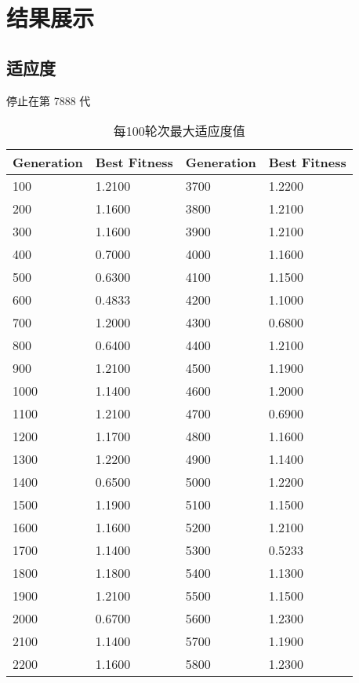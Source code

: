 \documentclass{ctexart}
\begin{document}
	\vspace{100pt}
	\section{结果展示}
	\subsection{适应度}
	停止在第 7888 代
		\begin{table}[htbp]
		\centering
		\caption{每100轮次最大适应度值}
		\begin{tabular}{|l|l||l|l|}
		\hline
		\textbf{Generation} & \textbf{Best Fitness} & \textbf{Generation} & \textbf{Best Fitness} \\
		\hline
		100 & 1.2100 & 3700 & 1.2200 \\
		\hline
		200 & 1.1600 & 3800 & 1.2100 \\
		\hline
		300 & 1.1600 & 3900 & 1.2100 \\
		\hline
		400 & 0.7000 & 4000 & 1.1600 \\
		\hline
		500 & 0.6300 & 4100 & 1.1500 \\
		\hline
		600 & 0.4833 & 4200 & 1.1000 \\
		\hline
		700 & 1.2000 & 4300 & 0.6800 \\
		\hline
		800 & 0.6400 & 4400 & 1.2100 \\
		\hline
		900 & 1.2100 & 4500 & 1.1900 \\
		\hline
		1000 & 1.1400 & 4600 & 1.2000 \\
		\hline
		1100 & 1.2100 & 4700 & 0.6900 \\
		\hline
		1200 & 1.1700 & 4800 & 1.1600 \\
		\hline
		1300 & 1.2200 & 4900 & 1.1400 \\
		\hline
		1400 & 0.6500 & 5000 & 1.2200 \\
		\hline
		1500 & 1.1900 & 5100 & 1.1500 \\
		\hline
		1600 & 1.1600 & 5200 & 1.2100 \\
		\hline
		1700 & 1.1400 & 5300 & 0.5233 \\
		\hline
		1800 & 1.1800 & 5400 & 1.1300 \\
		\hline
		1900 & 1.2100 & 5500 & 1.1500 \\
		\hline
		2000 & 0.6700 & 5600 & 1.2300 \\
		\hline
		2100 & 1.1400 & 5700 & 1.1900 \\
		\hline
		2200 & 1.1600 & 5800 & 1.2300 \\
		\hline

\end{tabular}
\end{table}
\end{document}
